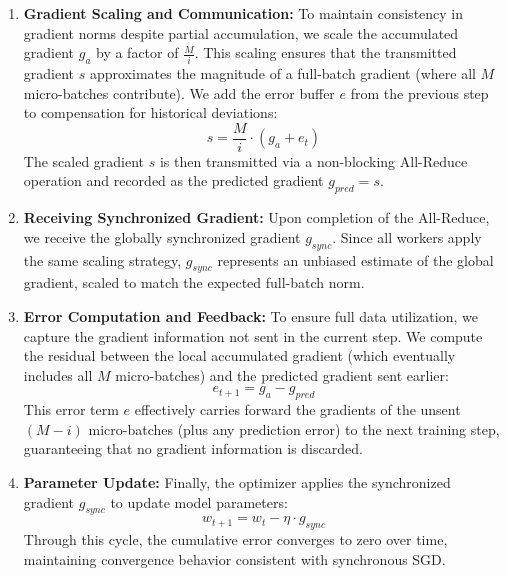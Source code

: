 \begin{enumerate}
    \item \textbf{Gradient Scaling and Communication:} 
    To maintain consistency in gradient norms despite partial accumulation, we scale the accumulated gradient $g_a$ by a factor of $\frac{M}{i}$. This scaling ensures that the transmitted gradient $s$ approximates the magnitude of a full-batch gradient (where all $M$ micro-batches contribute). We add the error buffer $e$ from the previous step to compensation for historical deviations:
    \begin{equation}
        s = \frac{M}{i} \cdot (g_a + e_{t})
    \end{equation}
    The scaled gradient $s$ is then transmitted via a non-blocking All-Reduce operation and recorded as the predicted gradient $g_{pred} = s$.
    
    \item \textbf{Receiving Synchronized Gradient:} 
    Upon completion of the All-Reduce, we receive the globally synchronized gradient $g_{sync}$. Since all workers apply the same scaling strategy, $g_{sync}$ represents an unbiased estimate of the global gradient, scaled to match the expected full-batch norm.
    
    \item \textbf{Error Computation and Feedback:} 
    To ensure full data utilization, we capture the gradient information not sent in the current step. We compute the residual between the local accumulated gradient (which eventually includes all $M$ micro-batches) and the predicted gradient sent earlier:
    \begin{equation}
        e_{t+1} = g_a - g_{pred}
    \end{equation}
    This error term $e$ effectively carries forward the gradients of the unsent $(M-i)$ micro-batches (plus any prediction error) to the next training step, guaranteeing that no gradient information is discarded.
    
    \item \textbf{Parameter Update:} 
    Finally, the optimizer applies the synchronized gradient $g_{sync}$ to update model parameters:
    \begin{equation}
        w_{t+1} = w_t - \eta \cdot g_{sync}
    \end{equation}
    Through this cycle, the cumulative error converges to zero over time, maintaining convergence behavior consistent with synchronous SGD.
\end{enumerate}

